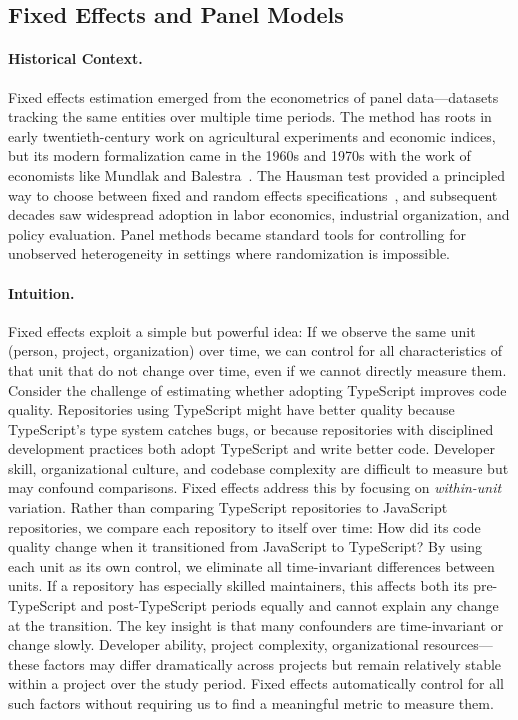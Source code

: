 \subsection{Fixed Effects and Panel Models}

\paragraph{Historical Context.}
Fixed effects estimation emerged from the econometrics of panel data---datasets tracking the same entities over multiple time periods.
The method has roots in early twentieth-century work on agricultural experiments and economic indices, but its modern formalization came in the 1960s and 1970s with the work of economists like Mundlak and Balestra~\cite{mundlak1978pooling, balestra1966pooling}.
The Hausman test provided a principled way to choose between fixed and random effects specifications~\cite{hausman1978specification}, and subsequent decades saw widespread adoption in labor economics, industrial organization, and policy evaluation.
Panel methods became standard tools for controlling for unobserved heterogeneity in settings where randomization is impossible.

\paragraph{Intuition.}
Fixed effects exploit a simple but powerful idea: If we observe the same unit (person, project, organization) over time, we can control for all characteristics of that unit that do not change over time, even if we cannot directly measure them.
Consider the challenge of estimating whether adopting TypeScript improves code quality.
Repositories using TypeScript might have better quality because TypeScript's type system catches bugs, or because repositories with disciplined development practices both adopt TypeScript and write better code.
Developer skill, organizational culture, and codebase complexity are difficult to measure but may confound comparisons.
Fixed effects address this by focusing on \emph{within-unit} variation.
Rather than comparing TypeScript repositories to JavaScript repositories, we compare each repository to itself over time: How did its code quality change when it transitioned from JavaScript to TypeScript?
By using each unit as its own control, we eliminate all time-invariant differences between units.
If a repository has especially skilled maintainers, this affects both its pre-TypeScript and post-TypeScript periods equally and cannot explain any change at the transition.
The key insight is that many confounders are time-invariant or change slowly.
Developer ability, project complexity, organizational resources---these factors may differ dramatically across projects but remain relatively stable within a project over the study period.
Fixed effects automatically control for all such factors without requiring us to find a meaningful metric to measure them.

